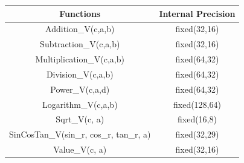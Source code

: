 \begin{table}
    \centering
    
    \begin{tabular}{|c|c|}
			\hline{Functions}&{Internal Precision}\\
			\hline
			
			Addition\_V(c,a,b)&fixed(32,16)\\
            \hline
			Subtraction\_V(c,a,b)&fixed(32,16)\\
            \hline
			Multiplication\_V(c,a,b)&fixed(64,32)\\
            \hline
			Division\_V(c,a,b)&fixed(64,32)\\
            \hline
			Power\_V(c,a,d)&fixed(64,32)\\
            \hline
			Logarithm\_V(c,a,b)&fixed(128,64)\\
            \hline
			Sqrt\_V(c, a)&fixed(16,8)\\
            \hline
			SinCosTan\_V(sin\_r, cos\_r, tan\_r, a)&fixed(32,29)\\
            \hline
			Value\_V(c, a)&fixed(32,16)\\
			\hline
    \end{tabular}
    
    
\end{table}